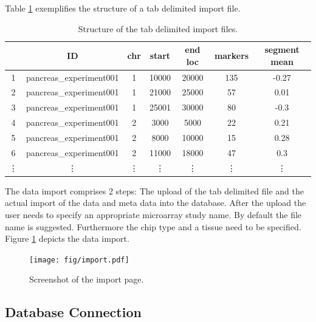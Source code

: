 \documentclass[11pt,final]{article}
\newcommand{\FO}[0]{\emph{FISH Oracle}\xspace}
\begin{document}
Table \ref{tab:tsv} exemplifies the structure of a tab delimited import file.

\begin{table}
	\centering
	\begin{tabular}[h]{|c|c|c|c|c|c|c|}
	  \hline
	  & ID & chr & start & end loc & markers & segment mean \\ \hline
	 1 & pancreas\_experiment001 & 1 & 10000 & 20000 & 135 & -0.27 \\
	 2 & pancreas\_experiment001 & 1 & 21000 & 25000 & 57 & 0.01 \\
	 3 & pancreas\_experiment001 & 1 & 25001 & 30000 & 80 & -0.3 \\
	 4 & pancreas\_experiment001 & 2 & 3000 & 5000 & 22 & 0.21 \\
	 5 & pancreas\_experiment001 & 2 & 8000 & 10000 & 15 & 0.28 \\
	 6 & pancreas\_experiment001 & 2 & 11000 & 18000 & 47 & 0.3 \\
	 \vdots & \vdots & \vdots & \vdots & \vdots & \vdots & \vdots \\
	\end{tabular}
	\caption{Structure of the tab delimited import files.}
	\label{tab:tsv}
\end{table}

The data import comprises 2 steps: The upload of the tab delimited file and
the actual import of the data and meta data into the database.
After the upload the user needs to specify an appropriate microarray study
name. By default the file name is suggested. Furthermore the chip type and a
tissue need to be specified. Figure \ref{fig:import} depicts the data import.

\begin{figure}[h]
	\begin{center}
	  \texttt{[image: fig/import.pdf]}
	\end{center}
	\caption{Screenshot of the import page.}
	\label{fig:import}
\end{figure}


\subsection{Database Connection}
\end{document}
